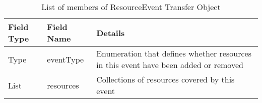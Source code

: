 \begin{table}[h] %
\begin{tabular}{| m{} | m{} | m{} | }
   \hline 
   \cellcolor[gray]{0.9} Field Type & \cellcolor[gray]{0.9} Field Name & \cellcolor[gray]{0.9} Details \\
   \hline
   Type & eventType & Enumeration that defines whether resources in this event have been added  or removed  \\
   List & resources & Collections of resources covered by this event \\
   \hline 
\end{tabular}
 \caption{List of members of ResourceEvent Transfer Object}
 \label{tab:TO_ResourceEvent}
\end{table} %


\renewcommand*\arraystretch{1}
